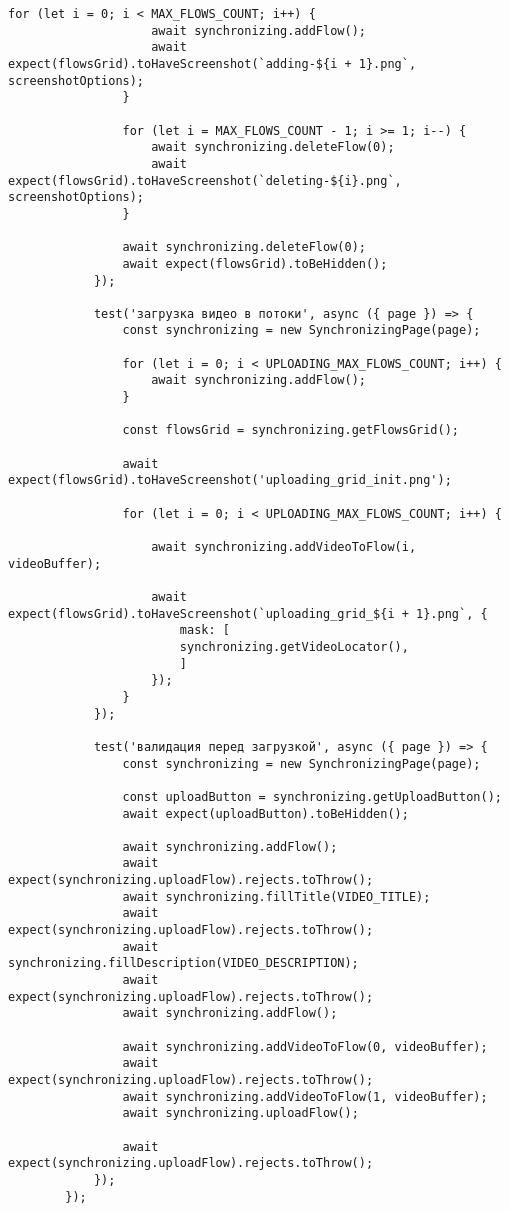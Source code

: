 \begin{lstlisting}[caption={tests/sync-editor/synchronizing.spec.ts}]
				for (let i = 0; i < MAX_FLOWS_COUNT; i++) {
					await synchronizing.addFlow();
					await expect(flowsGrid).toHaveScreenshot(`adding-${i + 1}.png`, screenshotOptions);
				}
				
				for (let i = MAX_FLOWS_COUNT - 1; i >= 1; i--) {
					await synchronizing.deleteFlow(0);
					await expect(flowsGrid).toHaveScreenshot(`deleting-${i}.png`, screenshotOptions);
				}
				
				await synchronizing.deleteFlow(0);
				await expect(flowsGrid).toBeHidden();
			});
			
			test('загрузка видео в потоки', async ({ page }) => {
				const synchronizing = new SynchronizingPage(page);
				
				for (let i = 0; i < UPLOADING_MAX_FLOWS_COUNT; i++) {
					await synchronizing.addFlow();
				}
				
				const flowsGrid = synchronizing.getFlowsGrid();
				
				await expect(flowsGrid).toHaveScreenshot('uploading_grid_init.png');
				
				for (let i = 0; i < UPLOADING_MAX_FLOWS_COUNT; i++) {
					
					await synchronizing.addVideoToFlow(i, videoBuffer);
					
					await expect(flowsGrid).toHaveScreenshot(`uploading_grid_${i + 1}.png`, {
						mask: [
						synchronizing.getVideoLocator(),
						]
					});
				}
			});
			
			test('валидация перед загрузкой', async ({ page }) => {
				const synchronizing = new SynchronizingPage(page);
				
				const uploadButton = synchronizing.getUploadButton();
				await expect(uploadButton).toBeHidden();
				
				await synchronizing.addFlow();
				await expect(synchronizing.uploadFlow).rejects.toThrow();
				await synchronizing.fillTitle(VIDEO_TITLE);
				await expect(synchronizing.uploadFlow).rejects.toThrow();
				await synchronizing.fillDescription(VIDEO_DESCRIPTION);
				await expect(synchronizing.uploadFlow).rejects.toThrow();
				await synchronizing.addFlow();
				
				await synchronizing.addVideoToFlow(0, videoBuffer);
				await expect(synchronizing.uploadFlow).rejects.toThrow();
				await synchronizing.addVideoToFlow(1, videoBuffer);
				await synchronizing.uploadFlow();
				
				await expect(synchronizing.uploadFlow).rejects.toThrow();
			});
		});
	\end{lstlisting}

